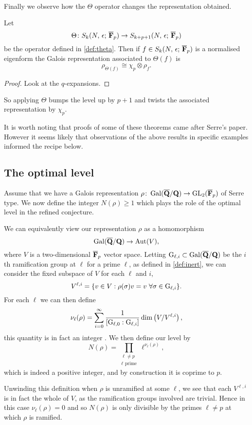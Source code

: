 \documentclass[a4paper,12pt]{article}
\begin{document}
Finally we observe how the $\Theta$ operator changes the representation obtained.

\begin{prop}\label{prop:theta}
Let
\[
\Theta\colon S_k(N,\,\epsilon;\,\overline{\mathbf{F}}_p)\to S_{k+p+1}(N,\,\epsilon;\,\overline{\mathbf{F}}_p)
\]
be the operator defined in \cref{def:theta}.
Then if $f \in S_k(N,\,\epsilon;\,\overline{\mathbf{F}}_p)$ is a normalised eigenform the Galois representation associated to $\Theta(f)$ is
\[
\rho_{\Theta(f)} \cong \chi_p\otimes\rho_{f}.
\]
\end{prop}
\begin{proof}
Look at the $q$-expansions. %
\end{proof}

So applying $\Theta$ bumps the level up by $p+1$ and twists the associated representation by $\chi_p$.

It is worth noting that proofs of some of these theorems came after Serre's paper.
However it seems likely that observations of the above results in specific examples informed the recipe below.


\subsection{The optimal level}\label{subsec:level}
Assume that we have a Galois representation $\rho\colon \operatorname{Gal}(\overline{\mathbf{Q}}/\mathbf{Q}) \to \operatorname{GL}_2(\overline{\mathbf{F}}_p)$ of Serre type.
We now define the integer $N(\rho) \ge 1$ which plays the role of the optimal level in the refined conjecture.

We can equivalently view our representation $\rho$ as a homomorphism
\[
\operatorname{Gal}(\overline{\mathbf{Q}}/\mathbf{Q}) \to \operatorname{Aut}(V),
\]
where $V$ is a two-dimensional $\overline{\mathbf{F}}_p$ vector space.
Letting $\mathrm{G}_{\ell,i}\subset \operatorname{Gal}(\overline{\mathbf{Q}}/\mathbf{Q})$ be the $i$th ramification group at $\ell$ for a prime $\ell$, as defined in \cref{def:inert}, we can consider the fixed subspace of $V$ for each $\ell$ and $i$,
\[
V^{\ell,i} = \{v\in V : \rho(\sigma) v = v\ \forall \sigma \in \G_{\ell,i}\}.
\]
For each $\ell$ we can then define
\[
\nu_\ell(\rho) = \sum_{i = 0}^{\infty} \frac{1}{[\mathrm{G}_{\ell,0} : \mathrm{G}_{\ell,i}]} \dim\left(V/V^{\ell,i}\right),
\]
this quantity is in fact an integer \cite{}. %
We then define our level by
\[
N(\rho) = \prod_{\substack{\ell \ne p\\ \ell\text{ prime}}} \ell^{\nu_\ell(\rho)},
\]
which is indeed a positive integer, and by construction it is coprime to $p$.

\begin{rmk}\label{rmk:unram}
Unwinding this definition when $\rho$ is unramified at some $\ell$, we see that each $V^{\ell,i}$ is in fact the whole of $V$, as the ramification groups involved are trivial. %
Hence in this case $\nu_\ell(\rho) = 0$ and so $N(\rho)$ is only divisible by the primes $\ell \ne p$ at which $\rho$ is ramified.
\end{rmk}
\end{document}
